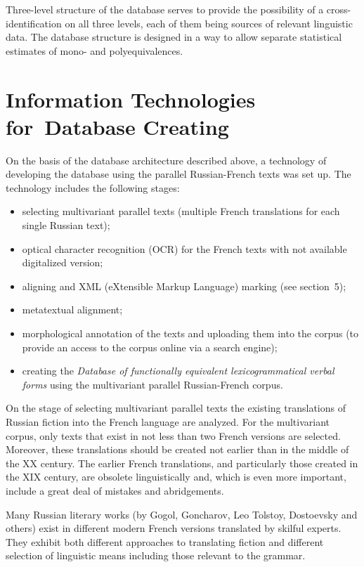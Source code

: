 \begin{multicols}{2}
   
   Three-level structure of the database serves to provide the possibility of a cross-identification on 
all three levels, each of them being sources of relevant linguistic data. The database structure is 
designed in a way  to allow separate statistical estimates of mono- and polyequivalences.

\section{Information Technologies for~Database Creating}

\noindent
On the basis of the database architecture described above, a technology of developing the database 
using the parallel Russian-French texts was set up. The technology includes the following stages:
\begin{itemize}
\item selecting multivariant parallel texts (multiple French translations for each single Russian 
text);
\item optical character recognition (OCR) for the French texts with not available digitalized version;
\item aligning and XML (eXtensible Markup Language) marking (see section~5);
\item metatextual alignment;
\item morphological annotation of the texts and uploading them into the corpus (to provide an 
access to the corpus online via a search engine);
\item creating the \textit{Database of functionally equivalent lexicogrammatical verbal forms} 
using the multivariant parallel Russian-French corpus.
   \end{itemize}
   
   On the stage of selecting multivariant parallel texts the existing translations of Russian fiction 
into the French language are analyzed. For the multivariant corpus, only texts that exist in not less 
than two French versions are selected. Moreover, these translations should be created not earlier 
than in the middle of the XX century. The earlier French translations, and particularly those created in 
the XIX century, are obsolete linguistically and, which is even more important, include a great deal 
of mistakes and abridgements.
   
   Many Russian literary works (by Gogol, Goncharov, Leo Tolstoy, Dostoevsky and others) exist 
in different modern French versions translated by skilful experts. They exhibit both different 
approaches to translating fiction and different selection of linguistic means including those relevant 
to the grammar.
   

\end{multicols}
